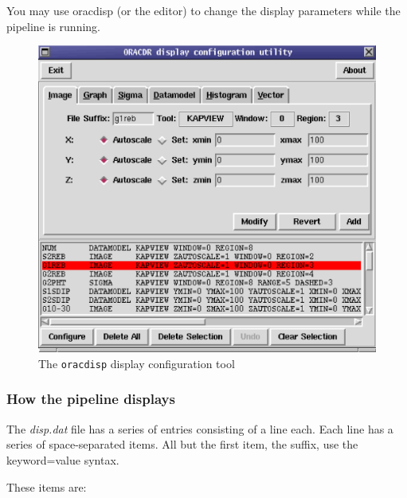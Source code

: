 \documentclass[twoside,11pt]{article}
\renewcommand{\_}{\texttt{\symbol{95}}}
\begin{document}
You may use oracdisp (or the editor) to change the display parameters
while the pipeline is running.

\begin{figure}
\includegraphics[width=\textwidth]{sun230_disp.eps}
\caption{The \texttt{oracdisp} display configuration tool}
\end{figure}


\subsubsection*{How the pipeline displays}

The {\em disp.dat\/} file has a series of entries consisting of a line
each. Each line has a series of space-separated items.  All but
the first item, the suffix, use the keyword=value syntax.

These items are:
\end{document}

